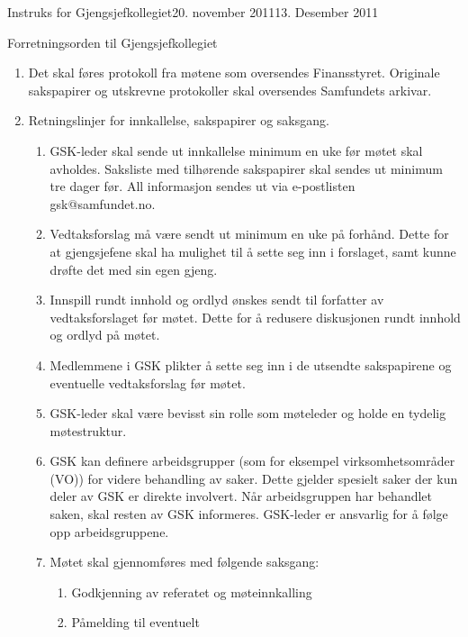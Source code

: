 \begin{instruks}{Instruks for Gjengsjefkollegiet}{20. november 2011}{13. Desember 2011}
\begin{instruksledd}{Forretningsorden til Gjengsjefkollegiet}
\begin{enumerate}
            \item Det skal føres protokoll fra møtene som oversendes Finansstyret. Originale
                sakspapirer og utskrevne
                protokoller skal oversendes Samfundets arkivar.
            \item Retningslinjer for innkallelse, sakspapirer og saksgang.
                \begin{enumerate}
                    \item GSK-leder skal sende ut innkallelse minimum en uke før møtet skal
                        avholdes. Saksliste med tilhørende
                        sakspapirer skal sendes ut minimum tre dager før. All informasjon sendes
                        ut via e-postlisten gsk@samfundet.no.
                    \item Vedtaksforslag må være sendt ut minimum en uke på forhånd. Dette for at
                        gjengsjefene skal ha mulighet
                        til å sette seg inn i forslaget, samt kunne drøfte det med sin egen gjeng.
                    \item Innspill rundt innhold og ordlyd
                        ønskes sendt til forfatter av vedtaksforslaget før møtet. Dette for å
                        redusere diskusjonen rundt innhold og
                        ordlyd på møtet.
                    \item Medlemmene i GSK plikter å sette seg inn i de utsendte sakspapirene og
                        eventuelle vedtaksforslag før
                        møtet.
                    \item GSK-leder skal være bevisst sin rolle som møteleder og holde en tydelig
                        møtestruktur.
                    \item GSK kan definere arbeidsgrupper (som for eksempel virksomhetsområder (VO))
                        for videre behandling
                        av saker. Dette gjelder spesielt saker der kun deler av GSK er direkte
                        involvert. Når arbeidsgruppen har
                        behandlet saken, skal resten av GSK informeres. GSK-leder er ansvarlig for
                        å følge opp
                        arbeidsgruppene.
                    \item Møtet skal gjennomføres med følgende saksgang:
                        \begin{enumerate}
                            \item Godkjenning av referatet og møteinnkalling
                            \item Påmelding til eventuelt

\end{enumerate}
\end{enumerate}
\end{enumerate}
\end{instruksledd}
\end{instruks}
